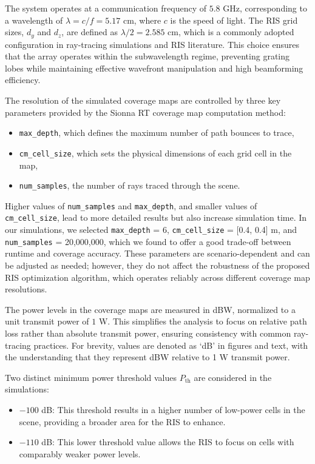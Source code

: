 \documentclass{IEEEoj}
\begin{document}
The system operates at a communication frequency of $5.8$ GHz, corresponding to a wavelength of $\lambda = c/f = 5.17$ cm, where $c$ is the speed of light. The RIS grid sizes, $d_y$ and $d_z$, are defined as $\lambda / 2 = 2.585$ cm, which is a commonly adopted configuration in ray-tracing simulations and RIS literature. This choice ensures that the array operates within the subwavelength regime, preventing grating lobes while maintaining effective wavefront manipulation and high beamforming efficiency.

The resolution of the simulated coverage maps are controlled by three key parameters provided by the Sionna RT coverage map computation method:
\begin{itemize}
	\item \texttt{max\_depth}, which defines the maximum number of path bounces to trace,
	\item \texttt{cm\_cell\_size}, which sets the physical dimensions of each grid cell in the map,
	\item \texttt{num\_samples}, the number of rays traced through the scene.
\end{itemize}
Higher values of \texttt{num\_samples} and \texttt{max\_depth}, and smaller values of \texttt{cm\_cell\_size}, lead to more detailed results but also increase simulation time. In our simulations, we selected \texttt{max\_depth} = 6, \texttt{cm\_cell\_size} = [0.4, 0.4] m, and \texttt{num\_samples} = 20,000,000, which we found to offer a good trade-off between runtime and coverage accuracy. These parameters are scenario-dependent and can be adjusted as needed; however, they do not affect the robustness of the proposed RIS optimization algorithm, which operates reliably across different coverage map resolutions.


The power levels in the coverage maps are measured in dBW, normalized to a unit transmit power of $1$ W. This simplifies the analysis to focus on relative path loss rather than absolute transmit power, ensuring consistency with common ray-tracing practices. For brevity, values are denoted as `dB' in figures and text, with the understanding that they represent dBW relative to 1 W transmit power.

Two distinct minimum power threshold values $P_{\text{th}}$ are considered in the simulations:  
\begin{itemize}
	\item $-100$ dB: This threshold results in a higher number of low-power cells in the scene, providing a broader area for the RIS to enhance.
	\item $-110$ dB: This lower threshold value allows the RIS to focus on cells with comparably weaker power levels.
\end{itemize}
\end{document}
